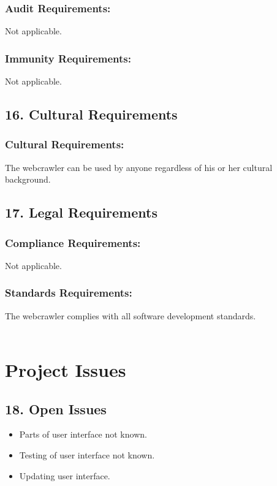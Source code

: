 \documentclass[titlepage]{article}
\begin{document}
\subsubsection*{Audit Requirements:}
Not applicable.

\subsubsection*{Immunity Requirements:}
Not applicable.

\subsection{16. Cultural Requirements}

\subsubsection*{Cultural Requirements:}

The webcrawler can be used by anyone regardless of his or her cultural background.

\subsection{17. Legal Requirements }

\subsubsection*{Compliance Requirements:}

Not applicable.

\subsubsection*{Standards Requirements:}

The webcrawler complies with all software development standards.\\
\\

\section{Project Issues}

\subsection{18. Open Issues }

\begin{itemize}
  \item Parts of user interface not known.
  \item Testing of user interface not known.
  \item Updating user interface.
\end{itemize}
\end{document}
